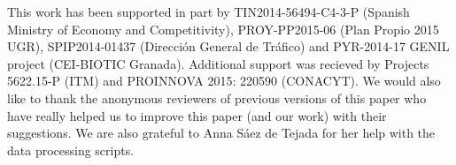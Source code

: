 \documentclass[journal,onecolumn]{IEEEtran}
\begin{document}
This work has been supported in part by
TIN2014-56494-C4-3-P (Spanish Ministry of Economy and Competitivity), PROY-PP2015-06 (Plan Propio 2015 UGR), 
SPIP2014-01437 (Direcci{\'o}n General de Tr{\'a}fico) and PYR-2014-17
GENIL project (CEI-BIOTIC Granada). Additional support was recieved by
Projects 5622.15-P (ITM) and  PROINNOVA 2015: 220590 (CONACYT).
We would also like to thank the
anonymous reviewers of previous versions of this paper who have really
helped us to improve 
this paper (and our work) with their suggestions. We are also grateful
to Anna S\'aez de Tejada for her help with the data processing scripts.



\end{document}
